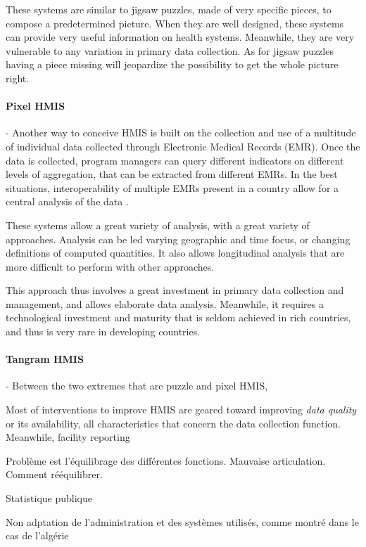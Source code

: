 \documentclass[a4paper,11pt,final,twoside]{article}
\begin{document}
These systems are similar to jigsaw puzzles, made of very specific pieces, to compose a predetermined picture. When they are well designed, these systems can provide very useful information on health systems. Meanwhile, they are very vulnerable to any variation in primary data collection. As for jigsaw puzzles having a piece missing will jeopardize the possibility to get the whole picture right.

\paragraph{Pixel HMIS} - Another way to conceive HMIS is built on the collection and use of a multitude of individual data collected through Electronic Medical Records (EMR). Once the data is collected, program managers can query different indicators on different levels of aggregation, that can be extracted from different EMRs. In the best situations, interoperability of multiple EMRs present in a country allow for a central analysis of the data \cite{pugliese2009large}.

These systems allow a great variety of analysis, with a great variety of approaches. Analysis can be led varying geographic and time focus, or changing definitions of computed quantities. It also allows longitudinal analysis that are more difficult to perform with other approaches.

This approach thus involves a great investment in primary data collection and management, and allows elaborate data analysis. Meanwhile, it requires a technological investment and maturity that is seldom achieved in rich countries, and thus is very rare in developing countries.

\paragraph{Tangram HMIS} - Between the two extremes that are puzzle and pixel HMIS,


Most of interventions to improve HMIS are geared toward improving \textit{data quality} or its availability, all characteristics that concern the data collection function. Meanwhile, facility reporting

Problème est l'équilibrage des différentes fonctions. Mauvaise articulation. Comment rééquilibrer.

Statistique publique

Non adptation de l'administration et des systèmes utilisés, comme montré dans le cas de l'algérie
\end{document}
